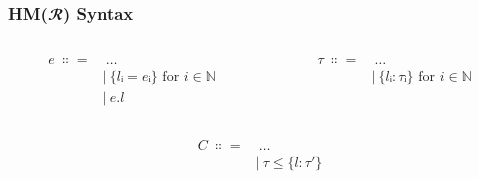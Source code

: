 \documentclass[aspectratio=169]{beamer}
\begin{document}
\begingroup
\Large
\begin{frame}[fragile]
  \frametitle{HM($𝓡$) Syntax}
  \begin{columns}
    \begin{column}{0.45\textwidth}
      \begin{center}
        \begin{align*}
          e \ ∷= & \ \dots                            \\
                 & | \ \{lᵢ = eᵢ\} \text{ for } i ∈ ℕ \\
                 & | \ e.l
        \end{align*}
      \end{center}
    \end{column}
    \begin{column}{0.45\textwidth}
      \begin{center}
        \begin{align*}
          τ \ ∷= & \ \dots                            \\
                 & | \ \{lᵢ : τᵢ\} \text{ for } i ∈ ℕ
        \end{align*}
      \end{center}
    \end{column}
  \end{columns}
  \begin{center}
    \begin{align*}
      C \ ∷= & \ \dots            \\
             & | \ τ ≤ \{l : τ′\}
    \end{align*}
  \end{center}
\end{frame}
\endgroup
\end{document}
